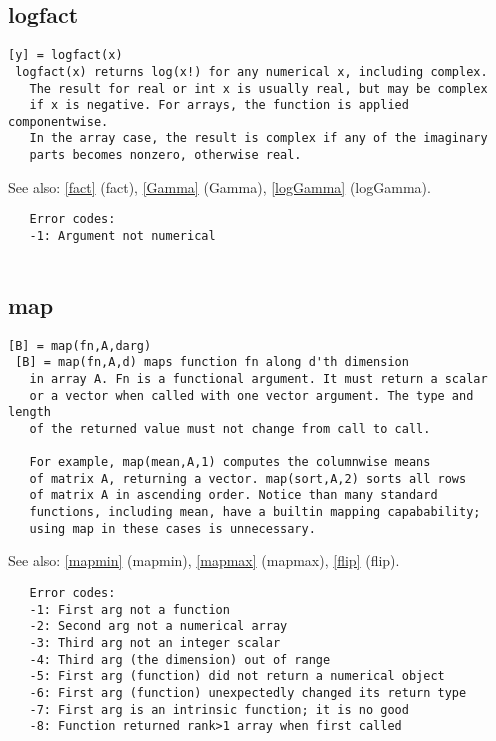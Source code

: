 \documentclass[a4paper]{article}
\begin{document}
\subsection{logfact\label{logfact}}

\begin{tscreen}
\begin{verbatim}
[y] = logfact(x)
 logfact(x) returns log(x!) for any numerical x, including complex.
   The result for real or int x is usually real, but may be complex
   if x is negative. For arrays, the function is applied componentwise.
   In the array case, the result is complex if any of the imaginary
   parts becomes nonzero, otherwise real.
\end{verbatim}

See also: \ref{fact} {(fact)}, \ref{Gamma} {(Gamma)}, \ref{logGamma} {(logGamma)}.
\begin{verbatim}
   Error codes:
   -1: Argument not numerical
 
\end{verbatim}
\end{tscreen}





\subsection{map\label{map}}

\begin{tscreen}
\begin{verbatim}
[B] = map(fn,A,darg)
 [B] = map(fn,A,d) maps function fn along d'th dimension
   in array A. Fn is a functional argument. It must return a scalar
   or a vector when called with one vector argument. The type and length
   of the returned value must not change from call to call.

   For example, map(mean,A,1) computes the columnwise means
   of matrix A, returning a vector. map(sort,A,2) sorts all rows
   of matrix A in ascending order. Notice than many standard
   functions, including mean, have a builtin mapping capabability;
   using map in these cases is unnecessary.
\end{verbatim}

See also: \ref{mapmin} {(mapmin)}, \ref{mapmax} {(mapmax)}, \ref{flip} {(flip)}.
\begin{verbatim}
   Error codes:
   -1: First arg not a function
   -2: Second arg not a numerical array
   -3: Third arg not an integer scalar
   -4: Third arg (the dimension) out of range
   -5: First arg (function) did not return a numerical object
   -6: First arg (function) unexpectedly changed its return type
   -7: First arg is an intrinsic function; it is no good
   -8: Function returned rank>1 array when first called
\end{verbatim}
\end{tscreen}
\end{document}
